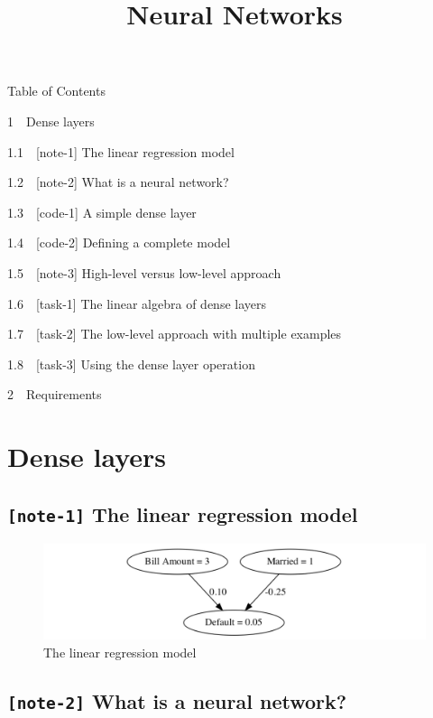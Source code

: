 \documentclass[11pt]{article}
\title{Neural Networks}
\begin{document}
    
    \maketitle
    
    

    
    Table of Contents{}

{{1~~}Dense layers}

{{1.1~~}{[}note-1{]} The linear regression model}

{{1.2~~}{[}note-2{]} What is a neural network?}

{{1.3~~}{[}code-1{]} A simple dense layer}

{{1.4~~}{[}code-2{]} Defining a complete model}

{{1.5~~}{[}note-3{]} High-level versus low-level approach}

{{1.6~~}{[}task-1{]} The linear algebra of dense layers}

{{1.7~~}{[}task-2{]} The low-level approach with multiple examples}

{{1.8~~}{[}task-3{]} Using the dense layer operation}

{{2~~}Requirements}

    \hypertarget{dense-layers}{%
\section{Dense layers}\label{dense-layers}}

    \hypertarget{note-1-the-linear-regression-model}{%
\subsection{\texorpdfstring{\texttt{{[}note-1{]}} The linear regression
model}{{[}note-1{]} The linear regression model}}\label{note-1-the-linear-regression-model}}

\begin{figure}
\centering
\includegraphics{../Figures/1. The linear regression model.jpg}
\caption{The linear regression model}
\end{figure}

    \hypertarget{note-2-what-is-a-neural-network}{%
\subsection{\texorpdfstring{\texttt{{[}note-2{]}} What is a neural
network?}{{[}note-2{]} What is a neural network?}}\label{note-2-what-is-a-neural-network}}
\end{document}
